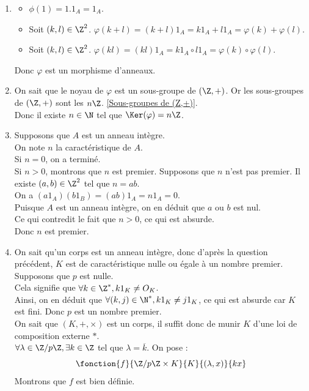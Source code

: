 \documentclass[8pt]{book}
\begin{document}
	\begin{enumerate}[leftmargin=*]
		\item \begin{itemize}
			\item $\phi(1)=1.1_A=1_A$.
			\item Soit $(k,l)\in\Z^2$. $\varphi(k+l)=(k+l)1_A=k1_A+l1_A=\varphi(k)+\varphi(l)$.
			\item Soit $(k,l)\in\Z^2$. $\varphi(kl)=(kl)1_A=k1_A\circ l1_A=\varphi(k)\circ\varphi(l)$.
			\end{itemize}
			Donc $\varphi$ est un morphisme d'anneaux.
		\item On sait que le noyau de $\varphi$ est un sous-groupe de $(\Z,+)$. Or les sous-groupes de $(\Z,+)$ sont les $n\Z$. \ref{Sous-groupes de (Z,+)}.\\ Donc il existe $n\in\N$ tel que $\Ker(\varphi)=n\Z$.
		\item  Supposons que $A$ est un anneau intègre.\\
		On note $n$ la caractéristique de $A$.\\
		Si $n=0$, on a terminé.\\
		Si $n>0$, montrons que $n$ est premier.
		Supposons que $n$ n'est pas premier. Il existe $(a,b)\in\Z^2$ tel que $n=ab$.\\
		On a $(a1_A)(b1_B)=(ab)1_A=n1_A=0$.\\
		Puisque $A$ est un anneau intègre, on en déduit que $a$ ou $b$ est nul.\\
		Ce qui contredit le fait que $n>0$, ce qui est absurde.\\
		Donc $n$ est premier.
		\item On sait qu'un corps est un anneau intègre, donc d'après la question précédent, $K$ est de caractéristique nulle ou égale à un nombre premier.\\
		Supposons que $p$ est nulle.\\
		Cela signifie que $\forall k\in\Z^*, k1_K\ne O_K$.\\
		Ainsi, on en déduit que $\forall(k,j)\in\N^*, k1_K\ne j1_K$, ce qui est absurde car $K$ est fini.
		Donc $p$ est un nombre premier.\\
		On sait que $(K,+,\times)$ est un corps, il suffit donc de munir $K$ d'une loi de composition externe $*$.\\
		$\forall \lambda\in\Z/p\Z, \exists k\in\Z$ tel que $\lambda=\overline{k}$.
		On pose : \[\fonction{f}{\Z/p\Z\times K}{K}{(\lambda,x)}{kx}\]
		Montrons que $f$ est bien définie.\\

\end{enumerate}
\end{document}

